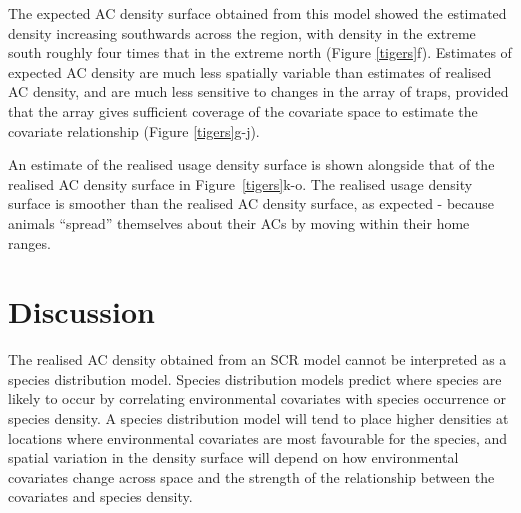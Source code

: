\documentclass[useAMS,usenatbib,referee]{biom}
\begin{document}
The expected AC density surface obtained from this model showed the estimated density increasing southwards across the region, with density in the extreme south roughly four times that in the extreme north (Figure \ref{tigers}f). Estimates of expected AC density are much less spatially variable than estimates of realised AC density, and are much less sensitive to changes in the array of traps, provided that the array gives sufficient coverage of the covariate space to estimate the covariate relationship (Figure \ref{tigers}g-j). 

An estimate of the realised usage density surface is shown alongside that of the realised AC density surface in Figure~\ref{tigers}k-o. The realised usage density surface is smoother than the realised AC density surface, as expected - because animals ``spread'' themselves about their ACs by moving within their home ranges. %

\section{Discussion} \label{discussion}
The realised AC density obtained from an SCR model cannot be interpreted as a species distribution model. Species distribution models predict where species are likely to occur by correlating environmental covariates with species occurrence or species density. %
A species distribution model will tend to place higher densities at locations where environmental covariates are most favourable for the species, and spatial variation in the density surface will depend on how environmental covariates change across space and the strength of the relationship between the covariates and species density.
\end{document}
